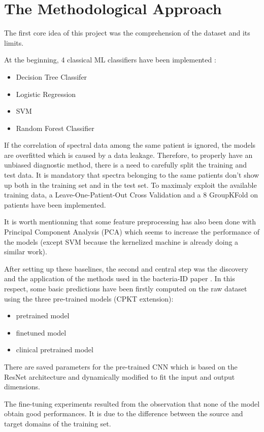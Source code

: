 \section{The Methodological Approach}

The first core idea of this project was the comprehension of the dataset and its limits.  

At the beginning, 4 classical ML classifiers have been implemented :
\begin{itemize}
\item Decision Tree Classifer
\item Logistic Regression 
\item SVM
\item Random Forest Classifier
\end{itemize}

If the correlation of spectral data among the same patient is ignored, the models are overfitted which is caused by a data leakage.
Therefore, to properly have an unbiased diagnostic method, there is a need to carefully split the training and test data. It is mandatory that spectra belonging to the same patients don't show up both in the training set and in the test set.
To maximaly exploit the available training data, a Leave-One-Patient-Out Cross Validation and a 8 GroupKFold on patients have been implemented. 

It is worth mentionning that some feature preprocessing has also been done with Principal Component Analysis (PCA) which seems to increase the performance of the models (except SVM because the kernelized machine is already doing a similar work).

After setting up these baselines, the second and central step was the discovery and the application of the methods used in the bacteria-ID paper \cite{bacteria-ID}. In this respect, some basic predictions have been firstly computed on the raw dataset using the three pre-trained models (CPKT extension): 
\begin{itemize}
\item pretrained model 
\item finetuned model 
\item clinical pretrained model
\end{itemize}
There are saved parameters for the pre-trained CNN which is based on the ResNet architecture and dynamically modified to fit the input and output dimensions.

The fine-tuning experiments resulted from the observation that none of the model obtain good performances. It is due to the difference between the source and target domains of the training set.

